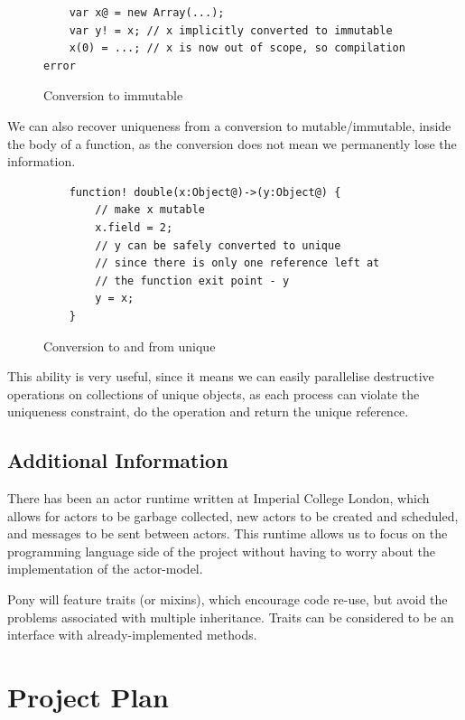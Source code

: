 \documentclass[11pt,a4paper]{report}
\begin{document}
\begin{figure}[H]
\begin{verbatim}
    var x@ = new Array(...);
    var y! = x; // x implicitly converted to immutable
    x(0) = ...; // x is now out of scope, so compilation error
\end{verbatim}
\caption{Conversion to immutable}
\end{figure}

We can also recover uniqueness from a conversion to mutable/immutable, inside the body of a function, as the conversion does not mean we permanently lose the information.

\begin{figure}[H]
\begin{verbatim}
    function! double(x:Object@)->(y:Object@) {
        // make x mutable
        x.field = 2;
        // y can be safely converted to unique
        // since there is only one reference left at
        // the function exit point - y
        y = x;
    }
\end{verbatim}
\caption{Conversion to and from unique}
\end{figure}

This ability is very useful, since it means we can easily parallelise destructive operations on collections of unique objects, as each process can violate the uniqueness constraint, do the operation and return the unique reference.

\section{Additional Information}

There has been an actor runtime written at Imperial College London, which allows for actors to be garbage collected, new actors to be created and scheduled, and messages to be sent between actors.
This runtime allows us to focus on the programming language side of the project without having to worry about the implementation of the actor-model.

Pony will feature traits\cite{traits} (or mixins\cite{esterbrook2001using}), which encourage code re-use, but avoid the problems associated with multiple inheritance\cite{boyland1996type}.
Traits can be considered to be an interface with already-implemented methods.

\newpage
\chapter{Project Plan}
\label{chapter:project}
\end{document}
